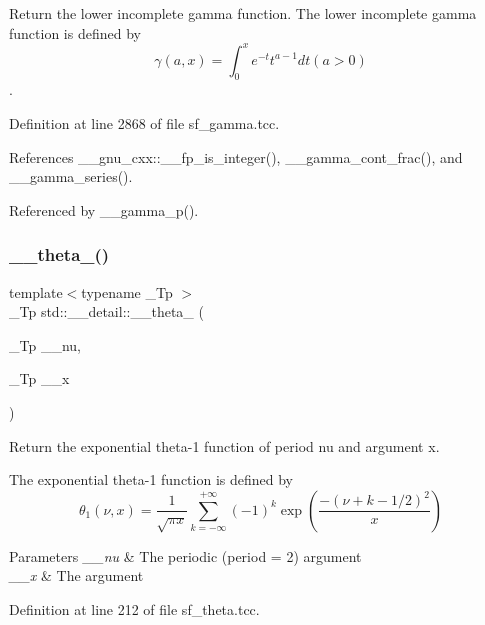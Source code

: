 Return the lower incomplete gamma function. The lower incomplete gamma function is defined by \[ \gamma(a,x) = \int_0^x e^{-t}t^{a-1}dt (a > 0) \]. 



Definition at line 2868 of file sf\+\_\+gamma.\+tcc.



References \+\_\+\+\_\+gnu\+\_\+cxx\+::\+\_\+\+\_\+fp\+\_\+is\+\_\+integer(), \+\_\+\+\_\+gamma\+\_\+cont\+\_\+frac(), and \+\_\+\+\_\+gamma\+\_\+series().



Referenced by \+\_\+\+\_\+gamma\+\_\+p().

\mbox{\label{namespacestd_1_1____detail_af7f54a82d2e5f0d8758cf53ebb2500e8}} 
\subsubsection{\texorpdfstring{\+\_\+\+\_\+theta\+\_()}{\_\_theta\_1()}}
{\footnotesize\ttfamily template$<$typename \+\_\+\+Tp $>$ \\
\+\_\+\+Tp std\+::\+\_\+\+\_\+detail\+::\+\_\+\+\_\+theta\+\_ (\begin{DoxyParamCaption}\item[{\+\_\+\+Tp}]{\+\_\+\+\_\+nu,  }\item[{\+\_\+\+Tp}]{\+\_\+\+\_\+x }\end{DoxyParamCaption})}

Return the exponential theta-\/1 function of period {\ttfamily nu} and argument {\ttfamily x}.

The exponential theta-\/1 function is defined by \[ \theta_1(\nu,x) = \frac{1}{\sqrt{\pi x}} \sum_{k=-\infty}^{+\infty} (-1)^k \exp\left( \frac{-(\nu + k - 1/2)^2}{x} \right) \]


\begin{DoxyParams}{Parameters}
{\em \+\_\+\+\_\+nu} & The periodic (period = 2) argument \\
\hline
{\em \+\_\+\+\_\+x} & The argument \\
\hline
\end{DoxyParams}


Definition at line 212 of file sf\+\_\+theta.\+tcc.




